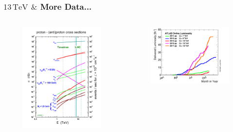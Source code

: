 \documentclass[xcolor={usenames,dvipsnames,svgnames,table}]{beamer}
\begin{document}
\begin{frame}
	\frametitle{$13\,\text{TeV}$ $\&$ More Data...}
	\begin{columns}
	\begin{column}{0.49\textwidth}
		\begin{figure}[t]
			\includegraphics[width=1.\textwidth]{plots/crosssections2013.jpg}
		\end{figure}
	\end{column}
	\begin{column}{0.49\textwidth}
		\begin{figure}[t]
			\includegraphics[width=1.\textwidth]{plots/intlumivsyear.png}

\end{figure}
\end{column}
\end{columns}
\end{frame}
\end{document}
